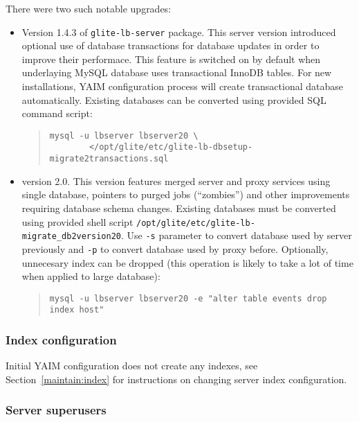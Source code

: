 There were two such notable upgrades:
\begin{itemize}
\item Version 1.4.3 of \texttt{glite-lb-server} package. This \LB server version introduced optional use of database transactions for \LB database updates in order to improve their performace. This feature is switched on by default when underlaying MySQL database uses transactional InnoDB tables. For new installations, YAIM configuration process will create transactional database automatically. Existing databases can be converted using provided SQL command script:
\begin{quote}
\begin{verbatim}
mysql -u lbserver lbserver20 \
        </opt/glite/etc/glite-lb-dbsetup-migrate2transactions.sql
\end{verbatim}
\end{quote}

\item {\sloppy \LB version 2.0.  This version features merged \LB server and  proxy services using single database, pointers to purged jobs (``zombies'') and other improvements requiring database schema changes. Existing databases must be converted using provided shell script \verb'/opt/glite/etc/glite-lb-migrate_db2version20'. Use \verb'-s' parameter to convert database used by \LB server previously and \verb'-p' to convert database used by \LB proxy before. Optionally, unnecesary index can be dropped (this operation is likely to take a lot of time when applied to large database):
\begin{quote}
\verb'mysql -u lbserver lbserver20 -e "alter table events drop index host"'
\end{quote}
}
\end{itemize}


\subsubsection{Index configuration}

Initial YAIM configuration does not create any \LB indexes, see Section~\ref{maintain:index} for instructions
on changing \LB server index configuration.


\subsubsection{Server superusers}
\label{inst:superusers}

